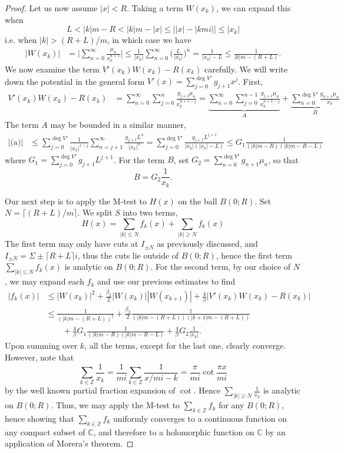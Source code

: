 \documentclass[10pt]{article}
\newcommand{\cc}{\mathbb{C}}
\newcommand{\zz}{\mathbb{Z}}
\theoremstyle{plain}
\theoremstyle{definition}
\theoremstyle{plain}
\begin{document}
\begin{proof}
	Let us now assume $|x|<R$. Taking a term $W(x_k)$, we can expand this when 
	\[ L<|k|m-R<|k|m-|x| \leq \big||x|-|kmi|\big|\leq |x_k|  \]
	i.e. when $|k|>(R+L)/m$, in which case we have
	\begin{align*}
		|W(x_k)|&=\bigg|\sum_{n=0}^\infty \frac{\mu_n}{x_k^{n+1}}\bigg| \leq \frac{1}{|x_k|}\sum_{n=0}^\infty \bigg(\frac{L}{|x_k|}\bigg)^{n}  = \frac{1}{|x_k|-L} \leq \frac{1}{|k|m-(R+L)}.
	\end{align*}
	We now examine the term $V'(x_k)W(x_k)-R(x_k)$ carefully. We will write down the potential in the general form $V'(x)=\sum_{j=0}^{\deg V'}g_{j+1}x^j$. First,
	\begin{align}
		V'(x_k)W(x_k)-R(x_k) &= \sum_{n=0}^\infty\sum_{j=0}^n \frac{g_{j+1}\mu_n}{x_{k}^{n+1-j}} = \underbrace{\sum_{n=0}^\infty \sum_{j=0}^{n-1} \frac{g_{j+1}\mu_n}{x_k^{n+1-j}}}_{A}+\underbrace{\sum_{n=0}^{\deg V'} \frac{g_{n+1}\mu_n}{x_k}}_{B} \label{cotdecomp}
	\end{align}
	The term $A$ may be bounded in a similar manner,
	\begin{align*}
		|\text{(a)}| &\leq \sum_{j=0}^{\deg V'}\frac{1}{|x_k|^{1-j}}\sum_{n=j+1}^\infty \frac{g_{j+1}L^n}{|x_k|^{n}} = \sum_{j=0}^{\deg V'} \frac{g_{j+1}L^{j+1}}{|x_k|(|x_k|-L)}\leq G_1 \frac{1}{(|k|m-R)(|k|m-R-L)}
	\end{align*}
	where $G_1 = \sum_{j=0}^{\deg V'} g_{j+1}L^{j+1}$. For the term $B$, set $G_2 = \sum_{n=0}^{\deg V'}g_{n+1}\mu_n$, so that
	\[ B = G_2 \frac{1}{x_k}. \] 
	
	Our next step is to apply the M-test to $H(x)$ on the ball $B(0;R)$. Set $N=\lceil(R+L)/m\rceil$. We split $S$ into two terms,
	\[ H(x) = \sum_{|k|\leq N} f_k(x) + \sum_{|k|\geq N} f_k(x) \]
	The first term may only have cuts at $I_{\pm N}$ as previously discussed, and $I_{\pm N} = \Sigma \pm \lceil R+L\rceil i$, thus the cuts lie outside of $B(0;R)$, hence the first term $\sum_{|k|\leq N} f_k(x)$ is analytic on $B(0;R)$. For the second term, by our choice of $N$, we may expand each $f_k$ and use our previous estimates to find 
	\begin{align}
		|f_k(x)| &\leq |W(x_k)|^2 + \frac{\beta_2}{2}|W(x_k)||W(x_{k+1})| + \frac{4}{\beta}|V'(x_k)W(x_k)-R(x_k)| \nonumber\\
		&\leq \frac{1}{(|k|m-(R+L))^2}+\frac{\beta_2}{2}\frac{1}{(|k|m-(R+L))(|k+1|m-(R+L))}\nonumber\\&\qquad+\frac{4}{\beta}G_1\frac{1}{(|k|m-R)(|k|m-R-L)} + \frac{4}{\beta}G_2 \frac{1}{|x_k|}. \label{fbound}
	\end{align} 
	Upon summing over $k$, all the terms, except for the last one, clearly converge. However, note that
	\[ \sum_{k\in\zz} \frac{1}{x_k} = \frac{1}{mi}\sum_{k\in\zz} \frac{1}{x/mi-k} = \frac{\pi}{mi}\cot\frac{\pi x}{mi} \]
	by the well known partial fraction expansion of $\cot$. Hence $\sum_{|k|\geq N} \frac{1}{x_k}$ is analytic on $B(0;R)$. Thus, we may apply the M-test to $\sum_{k\in\zz} f_k$ for any $B(0;R)$, hence showing that $\sum_{k\in\zz} f_k$ uniformly converges to a continuous function on any compact subset of $\cc$, and therefore to a holomorphic function on $\cc$ by an application of Morera's theorem.
\end{proof}
\end{document}
